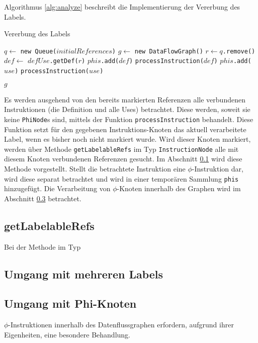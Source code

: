 Algorithmus \ref{alg:analyze} beschreibt die Implementierung der Vererbung 
des Labels.

\begin{algorithm}[H]
	\caption{Vererbung des Labels}\label{alg:analyze}
	\begin{algorithmic}[1]
		\STATE $q \gets$ \texttt{new Queue($initialReferences$)}
		\STATE $g \gets$ \texttt{new DataFlowGraph()}
			\STATE $r \gets q$\texttt{.remove()}
				\STATE $def \gets$ \texttt{$defUse$.getDef($r$)}
					\STATE \texttt{$phis$.add($def$)}
				\ELSE
						\STATE \texttt{processInstruction($def$)}
					\ENDIF
				\ENDIF
						\STATE \texttt{$phis$.add($use$)}
					\ELSE
							\STATE \texttt{processInstruction($use$)}
						\ENDIF
					\ENDIF
				\ENDFOR

			\ENDIF
		\ENDWHILE
		\RETURN $g$
	\end{algorithmic}
\end{algorithm}

Es werden ausgehend von den bereits markierten Referenzen alle verbundenen Instruktionen
(die Definition und alle Uses) betrachtet. Diese werden, soweit sie keine \texttt{PhiNode}s
sind, mittels der Funktion \texttt{processInstruction} behandelt. Diese Funktion setzt
für den gegebenen Instruktions-Knoten das aktuell verarbeitete Label, wenn es bisher 
noch nicht markiert wurde. Wird dieser Knoten markiert, werden über Methode 
\texttt{getLabelableRefs} im Typ \texttt{InstructionNode} alle mit diesem Knoten 
verbundenen Referenzen gesucht. Im Abschnitt \ref{ssec:labelRefs} wird diese Methode 
vorgestellt. Stellt die betrachtete Instruktion eine $\phi$-Instruktion dar, wird 
diese separat betrachtet und wird in einer temporären Sammlung \texttt{phis} hinzugefügt.
Die Verarbeitung von $\phi$-Knoten innerhalb des Graphen wird im Abschnitt \ref{ssec:phis}
betrachtet.

\subsection{getLabelableRefs}\label{ssec:labelRefs}

Bei der Methode im Typ 

\subsection{Umgang mit mehreren Labels}

\subsection{Umgang mit Phi-Knoten}\label{ssec:phis}

$\phi$-Instruktionen innerhalb des Datenflussgraphen erfordern, aufgrund ihrer Eigenheiten,
eine besondere Behandlung.  